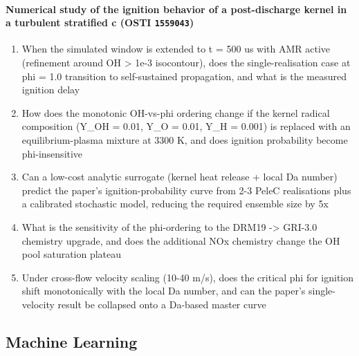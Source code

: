\documentclass[11pt]{article}
\begin{document}
\paragraph{Numerical study of the ignition behavior of a post-discharge kernel in a turbulent stratified c \textnormal{\small(OSTI \texttt{1559043})}}
\begin{enumerate}[leftmargin=1.6em,itemsep=0.2em,topsep=0.2em,label=Q\arabic*.]
\item When the simulated window is extended to t = 500 us with AMR active (refinement around OH \textgreater{} 1e-3 isocontour), does the single-realisation case at phi = 1.0 transition to self-sustained propagation, and what is the measured ignition delay
\item How does the monotonic OH-vs-phi ordering change if the kernel radical composition (Y\_OH = 0.01, Y\_O = 0.01, Y\_H = 0.001) is replaced with an equilibrium-plasma mixture at 3300 K, and does ignition probability become phi-insensitive
\item Can a low-cost analytic surrogate (kernel heat release + local Da number) predict the paper's ignition-probability curve from 2-3 PeleC realisations plus a calibrated stochastic model, reducing the required ensemble size by 5x
\item What is the sensitivity of the phi-ordering to the DRM19 -\textgreater{} GRI-3.0 chemistry upgrade, and does the additional NOx chemistry change the OH pool saturation plateau
\item Under cross-flow velocity scaling (10-40 m/s), does the critical phi for ignition shift monotonically with the local Da number, and can the paper's single-velocity result be collapsed onto a Da-based master curve
\end{enumerate}
\subsection*{Machine Learning}
\end{document}
